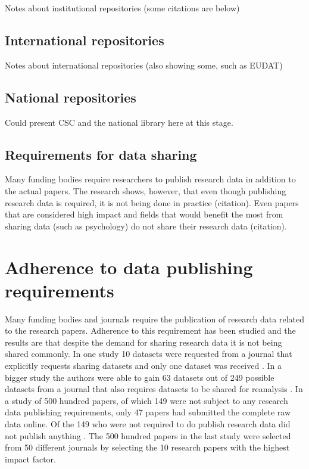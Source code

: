 Notes about institutional repositories (some citations are below)

\subsection{International repositories}

Notes about international repositories (also showing some, such as EUDAT)

\subsection{National repositories}

Could present CSC and the national library here at this stage.

\subsection{Requirements for data sharing}

Many funding bodies require researchers to publish research data in addition
to the actual papers. The research shows, however, that even though publishing
research data is required, it is not being done in practice (citation). Even
papers that are considered high impact and fields that would benefit the most
from sharing data (such as psychology) do not share their research data
(citation).

\fi

\section{Adherence to data publishing requirements}

Many funding bodies and journals require the publication of research data
related to the research papers. Adherence to this requirement has been studied
and the results are that despite the demand for sharing research data it is not
being shared commonly. In one study 10 datasets were requested from a journal
that explicitly requests sharing datasets and only one dataset was received
\cite{savage2009empirical}. In a bigger study the authors were able to gain
63 datasets out of 249 possible datasets from a journal that also requires
datasets to be shared for reanalysis \cite{wicherts2006poor}. In a study of
500 hundred papers, of which 149 were not subject to any research data
publishing requirements, only 47 papers had submitted the complete raw data
online. Of the 149 who were not required to do publish research data did not
publish anything \cite{alsheikh2011public}. The 500 hundred papers in the last
study were selected from 50 different journals by selecting the 10 research
papers with the highest impact factor.

